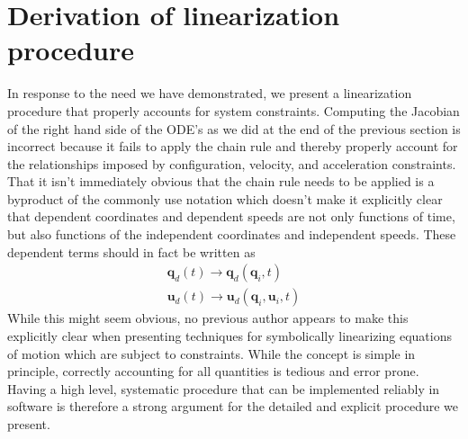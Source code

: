 \documentclass[smallcondensed,final]{svjour3}                     %
\begin{document}
\section{Derivation of linearization procedure}
\label{sec:derivations}
In response to the need we have demonstrated, we present a linearization
procedure that properly accounts for system constraints. Computing the Jacobian
of the right hand side of the ODE's as we did at the end of the previous
section is incorrect because it fails to apply the chain rule and thereby
properly account for the relationships imposed by configuration, velocity, and
acceleration constraints. That it isn't immediately obvious that the chain rule
needs to be applied is a byproduct of the commonly use notation which doesn't
make it explicitly clear that dependent coordinates and dependent speeds are not
only functions of time, but also functions of the independent coordinates and
independent speeds. These dependent terms should in fact be written as
\begin{align}
\label{eq:q_d_redefined}
\mathbf{q}_d (t) \to \mathbf{q}_d (\mathbf{q}_i, t) \\
\label{eq:u_d_redefined}
\mathbf{u}_d (t) \to \mathbf{u}_d (\mathbf{q}_i, \mathbf{u}_i, t)
\end{align}
While this might seem obvious, no previous author appears to make this
explicitly clear when presenting techniques for symbolically linearizing
equations of motion which are subject to constraints. While the concept is
simple in principle, correctly accounting for all quantities is tedious and
error prone. Having a high level, systematic procedure that can be implemented
reliably in software is therefore a strong argument for the detailed and
explicit procedure we present.
\end{document}
